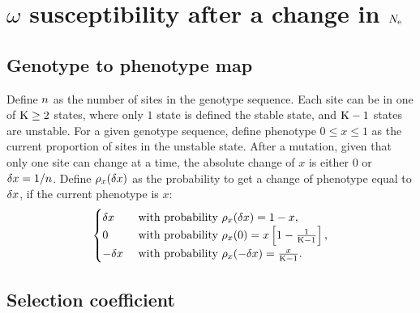 \section{\texorpdfstring{$\omega$}{ω} susceptibility after a change in \texorpdfstring{$N_{\text{e}}$}{Nₑ}}
\label{sec:susceptibility-after-a-change-in-Ne}

\subsection{Genotype to phenotype map}
\label{subsec:genotype-to-phenotype-map}

Define $n$ as the number of sites in the genotype sequence.
Each site can be in one of $\text{K} \geq 2$ states, where only $1$ state is defined the stable state, and $\text{K} - 1$ states are unstable.
For a given genotype sequence, define phenotype $0 \leq x \leq 1$ as the current proportion of sites in the unstable state.
After a mutation, given that only one site can change at a time, the absolute change of $x$ is either $0$ or $\delta x=1/n$.
Define $\rho_{x}(\delta x)$ as the probability to get a change of phenotype equal to $\delta x$, if the current phenotype is $x$:
\begin{gather}
    \begin{cases}
        \delta x &\text{ with probability } \rho_{x}(\delta x) = 1-x, \\
        0 &\text{ with probability } \rho_{x}(0) = x \left[1 - \frac{1}{\text{K} - 1}\right], \\
        -\delta x &\text{ with probability } \rho_{x}(-\delta x) = \frac{x}{\text{K} - 1}.\\
    \end{cases} \label{eq:proba-pheno}
\end{gather}

\subsection{Selection coefficient}
\label{subsec:selection-coefficient}

